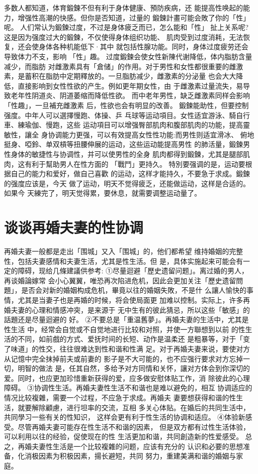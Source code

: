 \documentclass[12pt,UTF8]{ctexbook}
\begin{document}
多数人都知道，体育鍛鍊不但有利于身体健康、預防疾病，还
能提高性唤起的能力，增强性高潮的快感。但你是否知道，过量的
鍛鍊計畫可能会敗了你的「性」呢。
人们常认为鍛鍊过度，不过是身体疲乏而已，怎么能和「性」
扯上关系呢?这是因为强度过大的鍛鍊，不仅使得身体组织功能、
肌肉受到过度消耗，无法恢复，还会使身体各种机能低下·其中
就包括性腺功能。同时，身体过度疲劳还会导致体力不支，影响
「性」趣。
过度鍛鍊会使女性新陳代谢降低，体内脂肪含量减少，而脂肪
对雌激素具有「倉储」的作用。对于男性和女性都很重要的雌激
素，是蓄积在脂肪中定期釋放的。一旦脂肪减少，雌激素的分泌量
也会大大降低，直接影响到女性性欲的产生。例如更年期女性，由
于雌激素过量流失，易导致老年性阴道炎、阴道萎缩而降低性欲。
而中老年男性，缺乏雌激素同样会影响「性趣」，一旦補充雌激素
后，性欲也会有明显的改善。
鍛鍊能助性，但要控制强度。中年人可以選擇慢跑、体操、乒
乓球等运动項目。女性适宜游泳、騎自行車、練瑜伽、慢跑，这些
运动項目可以增强臀部肌肉和腹部肌肉的功能，提高靈敏性，讓全
身协调能力更强，可以有效提高女性性功能:而男性则适宜滑冰、
俯地挺身、啞鈴、单双槓等扭腰伸展的运动，这些运动能提高男性
的肺活量，鍛鍊男性身体的敏捷性与协调性，并可以使男性的全身
肌肉都得到鍛鍊，尤其是腿部肌肉，这有利于幫助男人在性方面的
「戰鬥」更持久。
特別要强调的是，运动要根据自己的能力和爱好，做自己喜歡
的运动，这样才能持久，不要急于求成。鍛鍊的强度应该是，今天
做了运动，明天不觉得疲乏，还能做运动，这样是合适的。如果今
天練完了，明天觉得累，要休息，就需要调整运动量了。

\section{谈谈再婚夫妻的性协调}

再婚夫妻一般都是走出「围城」又入「围城」的，他们都希望
维持婚姻的完整性，包括夫妻感情和夫妻生活，尤其是性生活。但
是，具体实施起来可能会有一定的障碍，现给几條建議供参考:
①尽量迴避「歷史遗留问题」。离过婚的男人，再谈婚論嫁常
会小心翼翼，唯恐再次陷进危机，因此会更加关注「歷史遗留問
題」，是否会对新的婚姻构成危机，畢竟以往的婚姻失敗，不是什
么讓人愉快的事情，尤其是当妻子也是再婚的时候，将会使局面更
加难以控制。实际上，许多再婚夫妻的心理和情感冲突，是来源于
无中生有的彼此猜忌，所以这些「敏感」的話題还是尽量迴避的
好。
②不要总是「重温舊夢」。再婚夫妻的生活中，尤其是性生活
中，经常会自觉或不自觉地进行比较和对照，并使一方聯想到以前
的性生活的不同，如前戲的方式、爱抚时间的长短、动作是温柔还
是粗暴等，对于「变了味道」的性交，往往很难达到性和谐和性满
足。对于再婚夫妻来说，要使对方从记憶中完全抹掉前夫或前妻的
影子是不大可能的，也不应强行要求对方忘掉一切，明智的做法
是，任其自然，多给予对方同情和关怀，讓对方体会到你深切的
爱。同时，也应更加珍惜重新获得的爱，应多做安慰体贴工作，消
除彼此的心理障碍。
③协调性生活。再婚夫妻性生活不和谐也是难以避免的，相互
协调适应的情况比较複雜，需要一个过程，不应急于求成。再婚夫
妻要想获得和谐的性生活，就要解除顧慮，进行坦率的交流，互相
多关心体贴。在婚后的共同生活中，共同學习一些有关的性知识，
这样会更有利于性生活的协调和适应。
④体验新感受。尽管再婚夫妻可能存在性生活不和谐的因素，
但是双方都有过性生活体验，可以利用以往的经验，促使现在的性
生活更加和谐，共同創造新的性爱感受。
总之，再婚夫妻性生活是一个比较複雜的问题，应该有充分的
认识和必要的思想准备，化消极因素为积极因素，揚长避短，共同
努力，重建美满和谐的婚姻与家庭。
\end{document}
